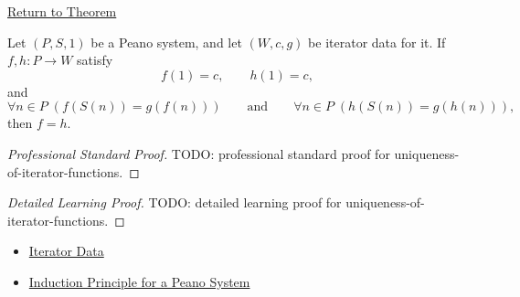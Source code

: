 \newpage
{}
\label{prf:uniqueness-of-iterator-functions}

\begin{remark*}[Return]
\hyperref[lem:uniqueness-of-iterator-functions]{Return to Theorem}
\end{remark*}

\begin{lemma*}
Let $(P,S,1)$ be a Peano system, and let $(W,c,g)$ be iterator data for it. If
$f,h:P\to W$ satisfy
\[
f(1)=c,\qquad h(1)=c,
\]
and
\[
\forall n\in P\;(f(S(n))=g(f(n)))
\qquad\text{and}\qquad
\forall n\in P\;(h(S(n))=g(h(n))),
\]
then $f=h$.
\end{lemma*}

\begin{proof}[Professional Standard Proof]
\LRAProofBodyStart
TODO: professional standard proof for uniqueness-of-iterator-functions.
\end{proof}

\begin{proof}[Detailed Learning Proof]
\LRAProofBodyStart
TODO: detailed learning proof for uniqueness-of-iterator-functions.
\end{proof}

\begin{remark*}
\end{remark*}

\begin{dependencies}
\begin{itemize}
  \item \hyperref[def:iterator-data-on-peano-system]{Iterator Data}
  \item \hyperref[thm:induction-principle-for-peano-system]{Induction Principle for a Peano System}
\end{itemize}
\end{dependencies}

\clearpage

